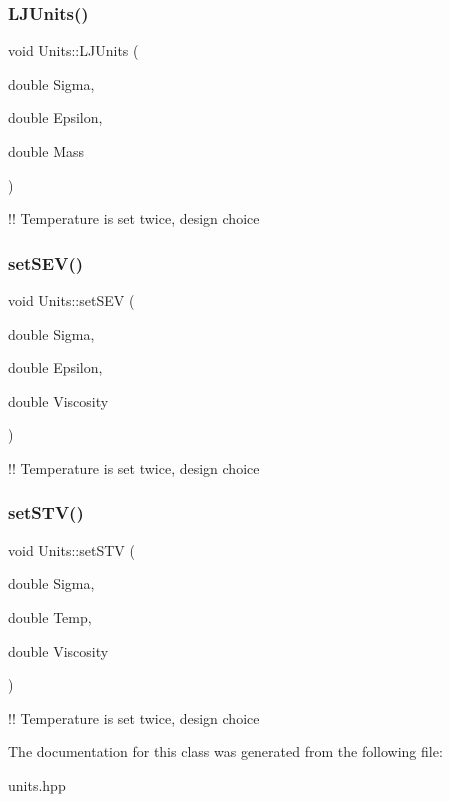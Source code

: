 \subsubsection{\texorpdfstring{L\+J\+Units()}{LJUnits()}}
{\footnotesize\ttfamily void Units\+::\+L\+J\+Units (\begin{DoxyParamCaption}\item[{double}]{Sigma,  }\item[{double}]{Epsilon,  }\item[{double}]{Mass }\end{DoxyParamCaption})\hspace{0.3cm}{\ttfamily [inline]}}

!! Temperature is set twice, design choice \mbox{\label{classUnits_a1fad99fd9135dc231c3b1bbed280f3ba}} 
\subsubsection{\texorpdfstring{set\+S\+E\+V()}{setSEV()}}
{\footnotesize\ttfamily void Units\+::set\+S\+EV (\begin{DoxyParamCaption}\item[{double}]{Sigma,  }\item[{double}]{Epsilon,  }\item[{double}]{Viscosity }\end{DoxyParamCaption})\hspace{0.3cm}{\ttfamily [inline]}}

!! Temperature is set twice, design choice \mbox{\label{classUnits_a58dd42e8873f092f4c4bcd4cafacf8d4}} 
\subsubsection{\texorpdfstring{set\+S\+T\+V()}{setSTV()}}
{\footnotesize\ttfamily void Units\+::set\+S\+TV (\begin{DoxyParamCaption}\item[{double}]{Sigma,  }\item[{double}]{Temp,  }\item[{double}]{Viscosity }\end{DoxyParamCaption})\hspace{0.3cm}{\ttfamily [inline]}}

!! Temperature is set twice, design choice 

The documentation for this class was generated from the following file\+:\begin{DoxyCompactItemize}
\item 
units.\+hpp\end{DoxyCompactItemize}

